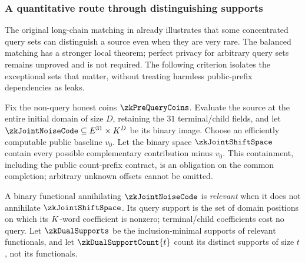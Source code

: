 \subsubsection{A quantitative route through distinguishing supports}

The original long-chain matching in  already illustrates that some concentrated query sets can distinguish a source even when they are very rare. The balanced matching has a stronger local theorem; perfect privacy for arbitrary query sets remains unproved and is not required. The following criterion isolates the exceptional sets that matter, without treating harmless public-prefix dependencies as leaks.

Fix the non-query honest coins $\zkPreQueryCoins$. Evaluate the source at the entire initial domain of size $D$, retaining the $31$ terminal/child fields, and let $\zkJointNoiseCode\subseteq\E^{31}\times\K^D$ be its binary image. Choose an efficiently computable public baseline $v_0$. Let the binary space $\zkJointShiftSpace$ contain every possible complementary contribution minus $v_0$. This containment, including the public count-prefix contract, is an obligation on the common completion; arbitrary unknown offsets cannot be omitted.

A binary functional annihilating $\zkJointNoiseCode$ is \emph{relevant} when it does not annihilate $\zkJointShiftSpace$. Its query support is the set of domain positions on which its $K$-word coefficient is nonzero; terminal/child coefficients cost no query. Let $\zkDualSupports$ be the inclusion-minimal supports of relevant functionals, and let $\zkDualSupportCount{t}$ count its distinct supports of size $t$, not its functionals.

